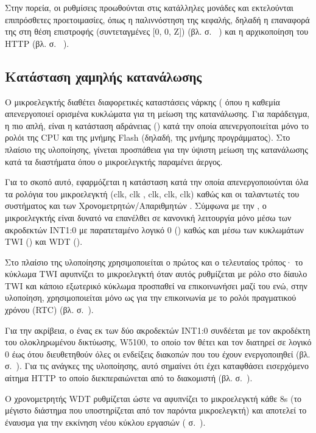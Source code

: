 Στην πορεία, οι ρυθμίσεις προωθούνται στις κατάλληλες μονάδες και εκτελούνται
επιπρόσθετες προετοιμασίες, όπως η παλιννόστηση της κεφαλής, δηλαδή η επαναφορά
της στη θέση επιστροφής (συντεταγμένες [0, 0, Z]) (βλ. σ.~%
\pageref{sec:motor:homing}) και η αρχικοποίηση του HTTP  (βλ. σ.~%
\pageref{ssubsec:network:port_mr}).


\subsection{Κατάσταση χαμηλής κατανάλωσης}

Ο μικροελεγκτής διαθέτει διαφορετικές καταστάσεις νάρκης (
όπου η καθεμία απενεργοποιεί ορισμένα κυκλώματα για τη μείωση της κατανάλωσης.
Για παράδειγμα, η πιο απλή, είναι η κατάσταση αδράνειας () κατά την
οποία απενεργοποιείται μόνο το ρολόι της CPU και της μνήμης Flash (δηλαδή, της
μνήμης προγράμματος). Στο πλαίσιο της υλοποίησης, γίνεται προσπάθεια για την
ύψιστη μείωση της κατανάλωσης κατά τα διαστήματα όπου ο μικροελεγκτής παραμένει
άεργος.

Για το σκοπό αυτό, εφαρμόζεται η κατάσταση  κατά την οποία
απενεργοποιούνται όλα τα ρολόγια του μικροελεγκτή (clk, clk%
, clk, clk, clk) καθώς και οι
ταλαντωτές του συστήματος και των Χρονομετρητών\slash{}Απαριθμητών \parencite%
[38]{atmel13}. Σύμφωνα με την \textcite[38]{atmel13}, ο μικροελεγκτής είναι
δυνατό να επανέλθει σε κανονική λειτουργία μόνο μέσω των ακροδεκτών INT1:0 με
παρατεταμένο λογικό 0 () καθώς και μέσω των κυκλωμάτων
TWI () και WDT ().

Στο πλαίσιο της υλοποίησης χρησιμοποιείται ο πρώτος και ο τελευταίος τρόπος· το
κύκλωμα TWI αφυπνίζει το μικροελεγκτή όταν αυτός ρυθμίζεται με ρόλο 
στο δίαυλο TWI και κάποιο εξωτερικό κύκλωμα προσπαθεί να επικοινωνήσει μαζί του
ενώ, στην υλοποίηση, χρησιμοποιείται μόνο ως  για την επικοινωνία με
το ρολόι πραγματικού χρόνου (RTC) (βλ.  σ.~\pageref{sec:rtc}).

Για την ακρίβεια, ο ένας εκ των δύο ακροδεκτών INT1:0 συνδέεται με τον ακροδέκτη
 του ολοκληρωμένου δικτύωσης, W5100, το οποίο τον θέτει και τον
διατηρεί σε λογικό 0 έως ότου διευθετηθούν όλες οι ενδείξεις διακοπών που του
έχουν ενεργοποιηθεί
(βλ.  σ.~\pageref{subsec:network:interface}).
Για τις ανάγκες της υλοποίησης, αυτό σημαίνει ότι έχει καταφθάσει εισερχόμενο
αίτημα HTTP το οποίο διεκπεραιώνεται από το διακομιστή (βλ.
 σ.~\pageref{sec:http-server}).

Ο χρονομετρητής WDT ρυθμίζεται ώστε να αφυπνίζει το μικροελεγκτή κάθε 8s (το
μέγιστο διάστημα που υποστηρίζεται από τον παρόντα μικροελεγκτή) και αποτελεί το
έναυσμα για την εκκίνηση νέου κύκλου εργασιών
( σ.~\pageref{ssubsec:task:initiate}).







